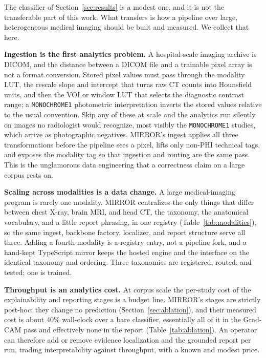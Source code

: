 \documentclass[conference]{IEEEtran}
\newcommand{\code}[1]{\texttt{\small #1}}
\newcommand{\rih}[1]{\textbf{#1}\enspace\ignorespaces}
\begin{document}
The classifier of Section~\ref{sec:results} is a modest one, and it is not the
transferable part of this work. What transfers is how a pipeline over large,
heterogeneous medical imaging should be built and measured. We collect that here.

\rih{Ingestion is the first analytics problem.} A hospital-scale imaging archive is
DICOM, and the distance between a DICOM file and a trainable pixel array is not a
format conversion. Stored pixel values must pass through the modality LUT, the
rescale slope and intercept that turns raw CT counts into Hounsfield units, and then
the VOI or window LUT that selects the diagnostic contrast range; a \code{MONOCHROME1}
photometric interpretation inverts the stored values relative to the usual
convention. Skip any of these at scale and the analytics run silently on images no
radiologist would recognize, most visibly the \code{MONOCHROME1} studies, which
arrive as photographic negatives. MIRROR's ingest applies all three transformations
before the pipeline sees a pixel, lifts only non-PHI technical tags, and exposes the
modality tag so that ingestion and routing are the same pass. This is the
unglamorous data engineering that a correctness claim on a large corpus rests on.

\rih{Scaling across modalities is a data change.} A large medical-imaging program is
rarely one modality. MIRROR centralizes the only things that differ between chest
X-ray, brain MRI, and head CT, the taxonomy, the anatomical vocabulary, and a little
report phrasing, in one registry (Table~\ref{tab:modalities}), so the same ingest,
backbone factory, localizer, and report structure serve all three. Adding a fourth
modality is a registry entry, not a pipeline fork, and a hand-kept TypeScript mirror
keeps the hosted engine and the interface on the identical taxonomy and ordering.
Three taxonomies are registered, routed, and tested; one is trained.

\rih{Throughput is an analytics cost.} At corpus scale the per-study cost of the
explainability and reporting stages is a budget line. MIRROR's stages are strictly
post-hoc: they change no prediction (Section~\ref{sec:ablation}), and their measured
cost is about $40\%$ wall-clock over a bare classifier, essentially all of it in the
Grad-CAM pass and effectively none in the report (Table~\ref{tab:ablation}). An
operator can therefore add or remove evidence localization and the grounded report
per run, trading interpretability against throughput, with a known and modest price.
\end{document}
